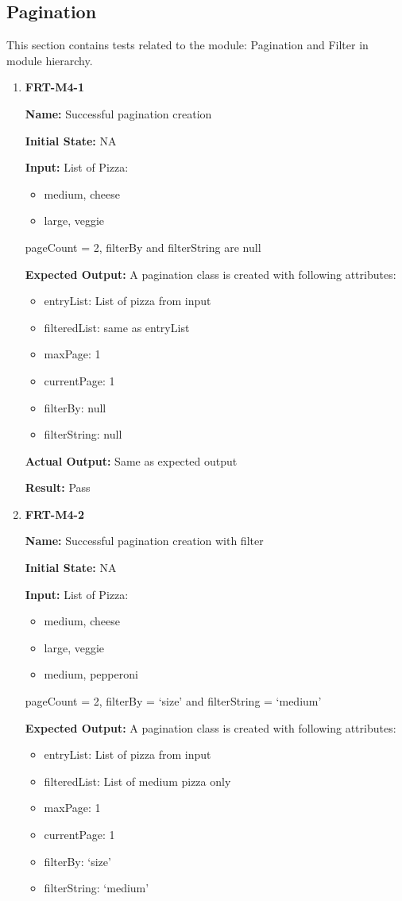 \documentclass[12pt, titlepage]{article}
\begin{document}
\subsection{Pagination}
This section contains tests related to the module: Pagination and Filter in module hierarchy.
\begin{enumerate}
\item \textbf{FRT-M4-1}

\textbf{Name:} Successful pagination creation

\textbf{Initial State:} NA

\textbf{Input:} List of Pizza:
\begin{itemize}
\item medium, cheese
\item large, veggie
\end{itemize}
pageCount = 2, filterBy and filterString are null

\textbf{Expected Output:} A pagination class is created with following attributes:
\begin{itemize}
\item entryList: List of pizza from input
\item filteredList: same as entryList
\item maxPage: 1
\item currentPage: 1
\item filterBy: null
\item filterString: null
\end{itemize}

\textbf{Actual Output:} Same as expected output

\textbf{Result:} Pass

\item \textbf{FRT-M4-2}

\textbf{Name:} Successful pagination creation with filter

\textbf{Initial State:} NA

\textbf{Input:} List of Pizza:
\begin{itemize}
\item medium, cheese
\item large, veggie
\item medium, pepperoni
\end{itemize}
pageCount = 2, filterBy = `size' and filterString = `medium'

\textbf{Expected Output:} A pagination class is created with following attributes:
\begin{itemize}
\item entryList: List of pizza from input
\item filteredList: List of medium pizza only
\item maxPage: 1
\item currentPage: 1
\item filterBy: `size'
\item filterString: `medium'
\end{itemize}


\end{enumerate}
\end{document}
